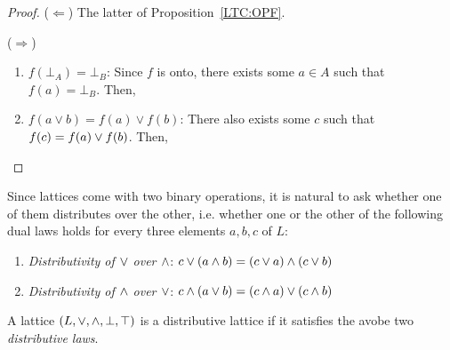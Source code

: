 \begin{proof}
($\Leftarrow$) The latter of Proposition~\ref{LTC:OPF}.

($\Rightarrow$) 
\begin{enumerate}
\item $f(\bot_A) = \bot_B$: 
Since $f$ is onto, there exists some $a \in A$ 
such that $f(a) = \bot_B$. Then,
\begin{prooftree}
\end{prooftree}

\item $f(a \vee b) = f(a) \vee f(b)$: 
There also exists some $c$ 
such that $ f(c) = f(a) \LTCjoin f(b)$. Then,
\begin{prooftree}
%
%
\end{prooftree}
\end{enumerate}
\end{proof}

%
%
Since lattices come with two binary operations, 
it is natural to ask whether one of them distributes over the other, 
i.e. whether one or the other of the following dual laws holds 
for every three elements $a, b, c$ of $L$:

\begin{enumerate}
\item {\em Distributivity of $\LTCjoin$ over $\LTCmeet$}:
$ c \LTCjoin (a \LTCmeet  b) = (c \LTCjoin a) \LTCmeet   (c \LTCjoin b)$
\item {\em Distributivity of $\LTCmeet$   over $\LTCjoin$}:
$c \LTCmeet  (a\LTCjoin b) = (c\LTCmeet  a) \LTCjoin  (c\LTCmeet  b)$
\end{enumerate}

\begin{definition}\label{distributiveLattice}
A lattice $(L,\LTCjoin,\LTCmeet,\LTCbot,\LTCtop)$ is a distributive lattice 
if it satisfies the avobe two {\em distributive laws}.
\end{definition}

